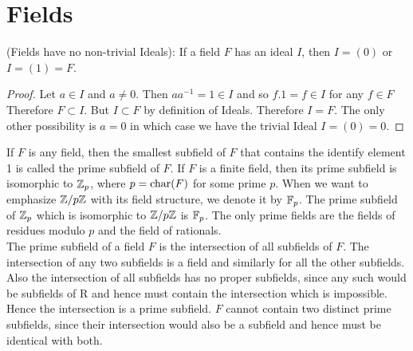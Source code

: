 \section{Fields}

\begin{theorem}{(Fields have no non-trivial Ideals):}
If a field $F$ has an ideal $I$, then $I = (0)$ or $I = (1) = F$. 
\end{theorem}
\begin{proof}
Let $a \in I$ and  $a\ne 0$. Then $a a^{-1} = 1 \in I$ and so $f.1 = f \in I$ for any $f\in F$ Therefore $ F \subset I$. But $I \subset F$ by definition of Ideals. Therefore $ I = F$. The only other possibility is $a=0$ in which case we have the trivial Ideal $ I = (0) = 0$.
\end{proof}

If $F$ is any field, then the smallest subfield of $F$ that contains the identify element 1 is called the {\elevenit prime subfield}\/ of $F$. If $F$ is a finite field, then its prime subfield is isomorphic to $\mathbb{Z}_p$, where $p = \hbox{char}(F)$ for some prime $p$. When we want to emphasize $\mathbb{Z}/p\mathbb{Z}$ with its field structure, we denote it by $\mathbb{F}_p$. The prime subfield of $\mathbb{Z}_p$ which is isomorphic to $\mathbb{Z}/p\mathbb{Z}$ is $\mathbb{F}_p$. The only prime fields are the fields of residues modulo $p$ and the field of rationals.\\

The prime subfield of a field $F$ is the intersection of all subfields of $F$. The intersection of any two subfields is a field and similarly for all the other subfields. Also the intersection of all subfields has no proper subfields, since any such would be subfields of R and hence must contain the intersection which is impossible. Hence the intersection is a prime subfield. $F$ cannot contain two distinct prime subfields, since their intersection would also be a subfield and hence must be identical with both. 
